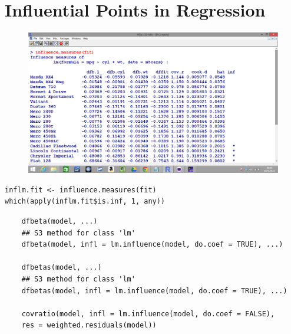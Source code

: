 \documentclass[residuals.tex]{subfiles}
\begin{document}
\newpage
	
\section{Influential Points in Regression}
 



\begin{figure}
\centering
\includegraphics[width=1.1\linewidth]{Screenshot2}
\caption{}
\label{fig:Screenshot2}
\end{figure}


\begin{verbatim}
inflm.fit <- influence.measures(fit)
which(apply(inflm.fit$is.inf, 1, any))
\end{verbatim}
\newpage


\begin{framed}
	\begin{verbatim}
	dfbeta(model, ...)
	## S3 method for class 'lm'
	dfbeta(model, infl = lm.influence(model, do.coef = TRUE), ...)
	
	dfbetas(model, ...)
	## S3 method for class 'lm'
	dfbetas(model, infl = lm.influence(model, do.coef = TRUE), ...)
	
	covratio(model, infl = lm.influence(model, do.coef = FALSE),
	res = weighted.residuals(model))
	\end{verbatim}
\end{framed}
\end{document}
